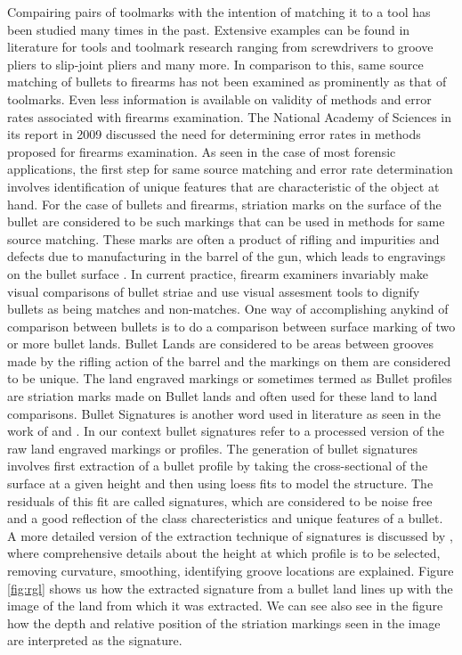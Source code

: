 \documentclass[12pt]{article}
\begin{document}
Compairing pairs of toolmarks with the intention of matching it to a
tool has been studied many times in the past. Extensive examples can be
found in literature for tools and toolmark research ranging from
screwdrivers \citep{manytoolmarks1, manytoolmarks2, chumbley} to groove
pliers \citep{manytoolmarks2} to slip-joint pliers \citep{afte-chumbley}
and many more. In comparison to this, same source matching of bullets to
firearms has not been examined as prominently as that of toolmarks. Even
less information is available on validity of methods and error rates
associated with firearms examination. The National Academy of Sciences
in its report in 2009 \citep{NAS:2009} discussed the need for
determining error rates in methods proposed for firearms examination. As
seen in the case of most forensic applications, the first step for same
source matching and error rate determination involves identification of
unique features that are characteristic of the object at hand. For the
case of bullets and firearms, striation marks on the surface of the
bullet are considered to be such markings that can be used in methods
for same source matching. These marks are often a product of rifling and
impurities and defects due to manufacturing in the barrel of the gun,
which leads to engravings on the bullet surface
\citep{afte-article1992}. In current practice, firearm examiners
invariably make visual comparisons of bullet striae and use visual
assesment tools to dignify bullets as being matches and non-matches. One
way of accomplishing anykind of comparison between bullets is to do a
comparison between surface marking of two or more bullet lands. Bullet
Lands are considered to be areas between grooves made by the rifling
action of the barrel and the markings on them are considered to be
unique. The land engraved markings or sometimes termed as Bullet
profiles \citep{aoas,ma2004} are striation marks made on Bullet lands
and often used for these land to land comparisons. Bullet Signatures is
another word used in literature as seen in the work of \citet{chu2013}
and \citet{aoas}. In our context bullet signatures refer to a processed
version of the raw land engraved markings or profiles. The generation of
bullet signatures involves first extraction of a bullet profile by
taking the cross-sectional of the surface at a given height and then
using loess fits to model the structure. The residuals of this fit are
called signatures, which are considered to be noise free and a good
reflection of the class charecteristics and unique features of a bullet.
A more detailed version of the extraction technique of signatures is
discussed by \citet{aoas}, where comprehensive details about the height
at which profile is to be selected, removing curvature, smoothing,
identifying groove locations are explained. Figure \ref{fig:rgl} shows
us how the extracted signature from a bullet land lines up with the
image of the land from which it was extracted. We can see also see in
the figure how the depth and relative position of the striation markings
seen in the image are interpreted as the signature.
\end{document}
